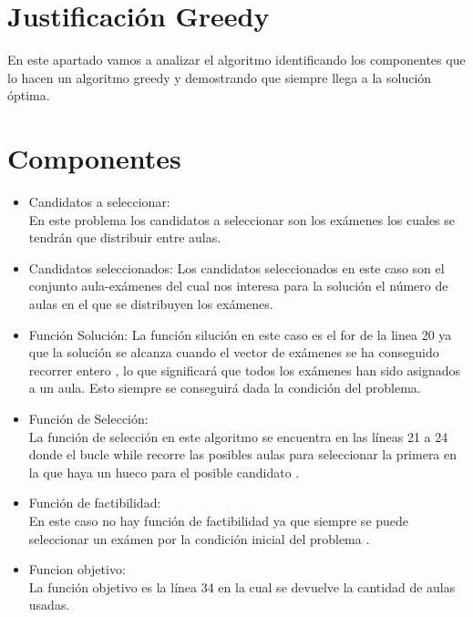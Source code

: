 \documentclass[11pt,openany]{book}
\begin{document}
\section{Justificación Greedy}

En este apartado vamos a analizar el algoritmo identificando los componentes que lo hacen un algoritmo greedy 
y demostrando que siempre llega a la solución óptima.
\section{Componentes}
\begin{itemize}
      \item Candidatos a seleccionar:\\
            En este problema los candidatos a seleccionar son los exámenes 
            los cuales se tendrán que distribuir entre aulas.
      \item Candidatos seleccionados:
            Los candidatos seleccionados en este caso son el conjunto aula-exámenes
            del cual nos interesa para la solución el número de aulas en el que se distribuyen los exámenes.

      \item Función Solución:
            La función silución en este caso es el for de la linea 20
            ya que la solución se alcanza cuando el vector de 
            exámenes se ha conseguido recorrer entero , lo que significará que 
            todos los exámenes han sido asignados a un aula.
            Esto siempre se conseguirá dada la condición del problema.
            

      \item Función de Selección:\\ 
            La función de selección en este algoritmo se encuentra
            en las líneas 21 a 24 donde el bucle while recorre las 
            posibles aulas para seleccionar la primera en la que haya 
            un hueco para el posible candidato .

      \item Función de factibilidad:\\
            
            

            En este caso no hay función de factibilidad ya que siempre se puede seleccionar un exámen por la 
            condición inicial del problema .


      \item Funcion objetivo: \\
            La función objetivo es la línea 34 en la cual se devuelve la cantidad de aulas usadas.

\end{itemize}
\end{document}
